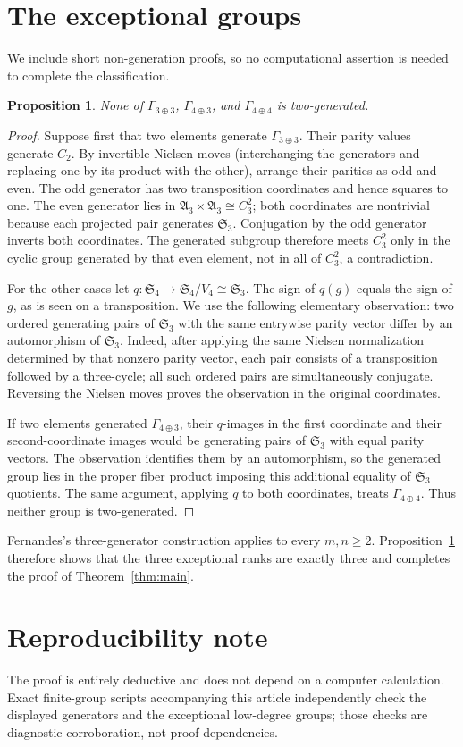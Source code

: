 \documentclass[11pt]{article}
\newtheorem{proposition}[theorem]{Proposition}
\newcommand{\Sym}{\mathfrak S}
\newcommand{\Alt}{\mathfrak A}
\begin{document}
\section{The exceptional groups}
We include short non-generation proofs, so no computational assertion is needed to complete the classification.
\begin{proposition}\label{prop:exceptions}
None of $\Gamma_{3\oplus3}$, $\Gamma_{4\oplus3}$, and $\Gamma_{4\oplus4}$ is two-generated.
\end{proposition}
\begin{proof}
Suppose first that two elements generate $\Gamma_{3\oplus3}$. Their parity values generate $C_2$. By invertible Nielsen moves (interchanging the generators and replacing one by its product with the other), arrange their parities as odd and even. The odd generator has two transposition coordinates and hence squares to one. The even generator lies in $\Alt_3\times\Alt_3\cong C_3^2$; both coordinates are nontrivial because each projected pair generates $\Sym_3$. Conjugation by the odd generator inverts both coordinates. The generated subgroup therefore meets $C_3^2$ only in the cyclic group generated by that even element, not in all of $C_3^2$, a contradiction.

For the other cases let $q:\Sym_4\to\Sym_4/V_4\cong\Sym_3$. The sign of $q(g)$ equals the sign of $g$, as is seen on a transposition. We use the following elementary observation: two ordered generating pairs of $\Sym_3$ with the same entrywise parity vector differ by an automorphism of $\Sym_3$. Indeed, after applying the same Nielsen normalization determined by that nonzero parity vector, each pair consists of a transposition followed by a three-cycle; all such ordered pairs are simultaneously conjugate. Reversing the Nielsen moves proves the observation in the original coordinates.

If two elements generated $\Gamma_{4\oplus3}$, their $q$-images in the first coordinate and their second-coordinate images would be generating pairs of $\Sym_3$ with equal parity vectors. The observation identifies them by an automorphism, so the generated group lies in the proper fiber product imposing this additional equality of $\Sym_3$ quotients. The same argument, applying $q$ to both coordinates, treats $\Gamma_{4\oplus4}$. Thus neither group is two-generated.
\end{proof}

Fernandes's three-generator construction \cite[Proposition~3]{Fernandes2026} applies to every $m,n\ge2$. Proposition~\ref{prop:exceptions} therefore shows that the three exceptional ranks are exactly three and completes the proof of Theorem~\ref{thm:main}.

\section*{Reproducibility note}
The proof is entirely deductive and does not depend on a computer calculation. Exact finite-group scripts accompanying this article independently check the displayed generators and the exceptional low-degree groups; those checks are diagnostic corroboration, not proof dependencies.



\end{document}
